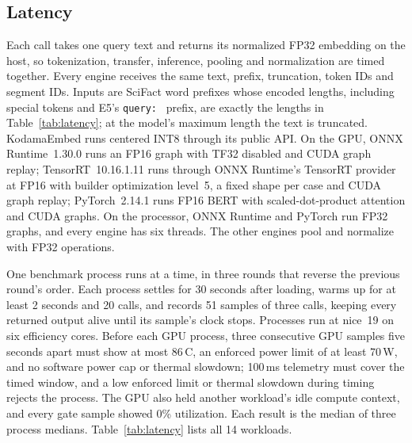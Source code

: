 \documentclass[10pt]{article}
\begin{document}
\subsection{Latency}

Each call takes one query text and returns its normalized FP32 embedding on
the host, so tokenization, transfer, inference, pooling and normalization are
timed together. Every engine receives the same text, prefix, truncation,
token IDs and segment IDs. Inputs are SciFact word prefixes whose encoded
lengths, including special tokens and E5's \texttt{query:~} prefix, are
exactly the lengths in Table~\ref{tab:latency}; at the model's maximum length
the text is truncated. KodamaEmbed runs centered INT8 through its public API.
On the GPU, ONNX Runtime~1.30.0 runs an FP16 graph with TF32 disabled and CUDA
graph replay; TensorRT~10.16.1.11 runs through ONNX Runtime's TensorRT
provider at FP16 with builder optimization level~5, a fixed shape per case and
CUDA graph replay; PyTorch~2.14.1 runs FP16 BERT with scaled-dot-product
attention and CUDA graphs. On the processor, ONNX Runtime and PyTorch run FP32
graphs, and every engine has six threads. The other engines pool and
normalize with FP32 operations.

One benchmark process runs at a time, in three rounds that reverse the
previous round's order. Each process settles for 30 seconds after loading,
warms up for at least 2 seconds and 20 calls, and records 51 samples of three
calls, keeping every returned output alive until its sample's clock stops.
Processes run at nice~19 on six efficiency cores. Before each GPU process,
three consecutive GPU samples five seconds apart must show at most
86\,\textdegree C, an enforced power limit of at least 70\,W, and no software
power cap or thermal slowdown; 100\,ms telemetry must cover the timed window,
and a low enforced limit or thermal slowdown during timing rejects the
process. The GPU also held another workload's idle compute context, and every
gate sample showed 0\% utilization. Each result is the median of three
process medians. Table~\ref{tab:latency} lists all 14 workloads.
\end{document}

